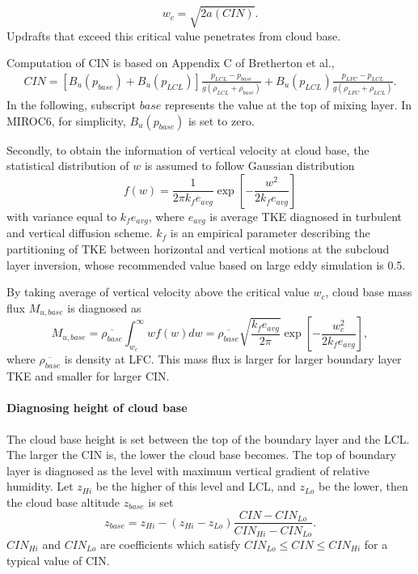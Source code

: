 \begin{equation}\label{wc}
    w_c = \sqrt{2a(CIN)}.
\end{equation}
Updrafts that exceed this critical value penetrates from cloud base.

Computation of CIN is based on Appendix C of Bretherton et al.,
\begin{align}\label{def_CIN}
    CIN = [B_u(p_{base}) + B_u(p_{LCL})]\frac{p_{LCL}-p_{base}}{g(\rho_{LCL}+\rho_{base})} + B_u(p_{LCL})\frac{p_{LFC}-p_{LCL}}{g(\rho_{LFC}+\rho_{LCL})}.
\end{align}
In the following, subscript $\mathit{base}$ represents the value at the top of mixing layer.
In MIROC6, for simplicity, $B_u(p_{base})$ is set to zero.

Secondly, to obtain the information of vertical velocity at cloud base, the statistical distribution of $w$ is assumed to follow Gaussian distribution
\begin{equation}\label{distr_w}
    f(w) = \frac{1}{2\pi k_f e_{avg}}\exp\left[ -\frac{w^2}{2k_fe_{avg}}\right]
\end{equation}
with variance equal to $k_f e_{avg}$, where $e_{avg}$ is average TKE diagnosed in turbulent and vertical diffusion scheme.
$k_f$ is an empirical parameter describing the partitioning of TKE between horizontal and vertical motions at the subcloud layer inversion, whose recommended value based on large eddy simulation is 0.5.

By taking average of vertical velocity above the critical value $w_c$, cloud base mass flux $M_{u,base}$ is diagnosed as
\begin{equation}\label{Mubase}
    M_{u,base}=\overline{\rho_{base}}\int_{w_c}^{\infty}wf(w)dw =\overline{\rho_{base}}\sqrt{\frac{k_f e_{avg}}{2\pi}}\exp\left[-\frac{w_c^2}{2k_fe_{avg}}\right],
\end{equation}
where $\overline{\rho_{base}}$ is density at LFC.
This mass flux is larger for larger boundary layer TKE and smaller for larger CIN.

\paragraph{Diagnosing height of cloud base}\label{diagno-height-of-cloud-base}

The cloud base height is set between the top of the boundary layer and the LCL. The larger the CIN is, the lower the cloud base becomes.
The top of boundary layer is diagnosed as the level with maximum vertical gradient of relative humidity.
Let $z_{Hi}$ be the higher of this level and LCL, and $z_{Lo}$ be the lower, then the cloud base altitude $z_{base}$ is set
\begin{equation}\label{zbase}
    z_{base} = z_{Hi} - (z_{Hi}-z_{Lo})\frac{CIN-CIN_{Lo}}{CIN_{Hi} - CIN_{Lo}}.
\end{equation}
$CIN_{Hi}$ and $CIN_{Lo}$ are coefficients which satisfy $CIN_{Lo}\le CIN \le CIN_{Hi}$ for a typical value of CIN.

